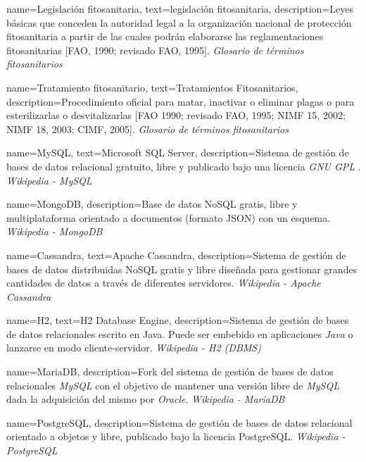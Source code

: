 {
    name={Legislación fitosanitaria},
    text={legislación fitosanitaria},
    description={Leyes básicas que conceden la autoridad legal a la organización nacional de protección fitosanitaria a partir de las cuales podrán elaborarse las reglamentaciones fitosanitarias [FAO, 1990; revisado FAO, 1995]. \textit{Glosario de términos fitosanitarios} \cite{glosarioterminosfito}}
}

{
    name={Tratamiento fitosanitario},
    text={Tratamientos Fitosanitarios},
    description={Procedimiento oficial para matar, inactivar o eliminar plagas o para esterilizarlas o desvitalizarlas [FAO 1990; revisado FAO, 1995; NIMF 15, 2002; NIMF 18, 2003; CIMF, 2005]. \textit{Glosario de términos fitosanitarios} \cite{glosarioterminosfito}}
}

{
    name={MySQL},
    text={Microsoft SQL Server},
    description={Sistema de gestión de bases de datos relacional gratuito, libre y publicado bajo una licencia \textit{GNU GPL} \cite{gnuglp}. \textit{Wikipedia - MySQL} \cite{wikimysql}}
}

{
    name={MongoDB},
    description={Base de datos NoSQL gratis, libre y multiplataforma orientado a documentos (formato JSON) con un esquema. \textit{Wikipedia - MongoDB} \cite{wikimongodb}}
}

{
	name={Cassandra},
    text={Apache Cassandra},
    description={Sistema de gestión de bases de datos distribuidas NoSQL gratis y libre diseñada para gestionar grandes cantidades de datos a través de diferentes servidores. \textit{Wikipedia - Apache Cassandra} \cite{wikicassandra}}
}

{
    name={H2},
    text={H2 Database Engine},
    description={Sistema de gestión de bases de datos relacionales escrito en Java. Puede ser embebido en aplicaciones \textit{Java} o lanzarse en modo cliente-servidor. \textit{Wikipedia - H2 (DBMS)} \cite{wikih2}}
}

{
    name={MariaDB},
    description={Fork del sistema de gestión de bases de datos relacionales \textit{MySQL} con el objetivo de mantener una versión libre de \textit{MySQL} dada la adquisición del mismo por \textit{Oracle}. \textit{Wikipedia - MariaDB} \cite{wikimariadb}}
}

{
    name={PostgreSQL},
    description={Sistema de gestión de bases de datos relacional orientado a objetos y libre, publicado bajo la licencia PostgreSQL. \textit{Wikipedia - PostgreSQL} \cite{wikipostgresql}}
}

